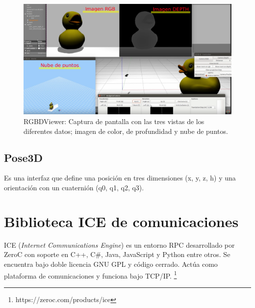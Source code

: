 \begin{figure}[th]
\centering
\includegraphics[scale=0.2]{Figures/rgbdviewer2.png}
\decoRule
\caption[Captura de RGBDViewer]{RGBDViewer: Captura de pantalla con las tres vistas de los diferentes datos; imagen de color, de profundidad y nube de puntos.}
\label{fig:RgbdViewer}
\end{figure}

\subsection{Pose3D}

Es una interfaz que define una posición en tres dimensiones (x, y, z, h) y una orientación con un cuaternión (q0, q1, q2, q3).



\section{Biblioteca ICE de comunicaciones}

ICE (\textit{Internet Communications Engine}) es un entorno RPC desarrollado por ZeroC con soporte en C++, C\#, Java, JavaScript y Python entre otros. Se encuentra bajo doble licencia GNU GPL y código cerrado. Actúa como plataforma de comunicaciones y funciona bajo TCP/IP. \footnote{https://zeroc.com/products/ice}


